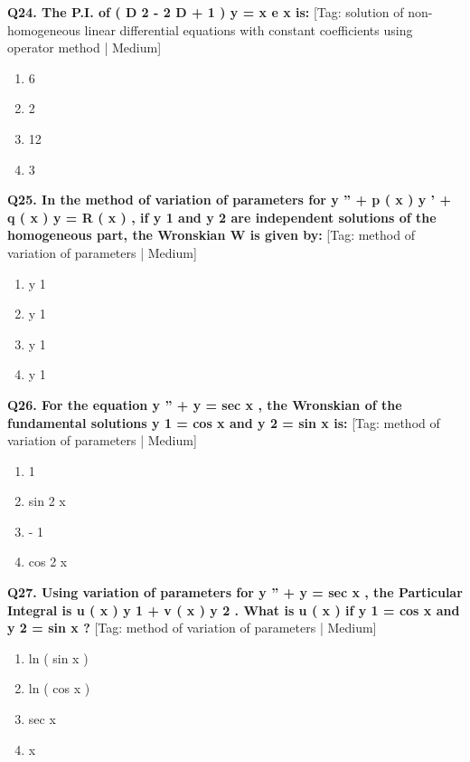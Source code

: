 \noindent\textbf{Q24. The P.I. of ( D 2 - 2 D + 1 ) y = x e x is:} \hfill [Tag: solution of non-homogeneous linear differential equations with constant coefficients using operator method | Medium]
\begin{enumerate}[label=(\alph*),topsep=2pt,itemsep=1pt,partopsep=0pt,parsep=0pt]
    \item {{6}}
    \item {{2}}
    \item {{12}}
    \item {{3}}
\end{enumerate}
\vspace{2mm}

\noindent\textbf{Q25. In the method of variation of parameters for y '' + p ( x ) y ' + q ( x ) y = R ( x ) , if y 1 and y 2 are independent solutions of the homogeneous part, the Wronskian W is given by:} \hfill [Tag: method of variation of parameters | Medium]
\begin{enumerate}[label=(\alph*),topsep=2pt,itemsep=1pt,partopsep=0pt,parsep=0pt]
    \item {{y 1}}
    \item {{y 1}}
    \item {{y 1}}
    \item {{y 1}}
\end{enumerate}
\vspace{2mm}

\noindent\textbf{Q26. For the equation y '' + y = sec x , the Wronskian of the fundamental solutions y 1 = cos x and y 2 = sin x is:} \hfill [Tag: method of variation of parameters | Medium]
\begin{enumerate}[label=(\alph*),topsep=2pt,itemsep=1pt,partopsep=0pt,parsep=0pt]
    \item {{1}}
    \item {{sin 2 x}}
    \item {{- 1}}
    \item {{cos 2 x}}
\end{enumerate}
\vspace{2mm}

\noindent\textbf{Q27. Using variation of parameters for y '' + y = sec x , the Particular Integral is u ( x ) y 1 + v ( x ) y 2 . What is u ( x ) if y 1 = cos x and y 2 = sin x ?} \hfill [Tag: method of variation of parameters | Medium]
\begin{enumerate}[label=(\alph*),topsep=2pt,itemsep=1pt,partopsep=0pt,parsep=0pt]
    \item {{ln ( sin x )}}
    \item {{ln ( cos x )}}
    \item {{sec x}}
    \item {{x}}
\end{enumerate}
\vspace{2mm}

